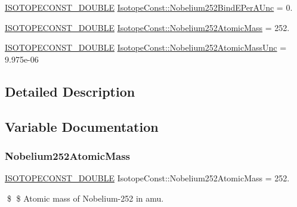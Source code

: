 \begin{DoxyCompactItemize}
\mbox{\hyperlink{group___isotope_const-_macros_ga8f45a7272ce02c0b4c65c44636ed719a}{I\+S\+O\+T\+O\+P\+E\+C\+O\+N\+S\+T\+\_\+\+D\+O\+U\+B\+LE}} \mbox{\hyperlink{group___isotope_const-_nobelium-_no252_ga08a5d790973b105d6891b772dd71ed05}{Isotope\+Const\+::\+Nobelium252\+Bind\+E\+Per\+A\+Unc}} = 0.
\item 
\mbox{\hyperlink{group___isotope_const-_macros_ga8f45a7272ce02c0b4c65c44636ed719a}{I\+S\+O\+T\+O\+P\+E\+C\+O\+N\+S\+T\+\_\+\+D\+O\+U\+B\+LE}} \mbox{\hyperlink{group___isotope_const-_nobelium-_no252_ga72af2ceb8d68d671a45b9e6c502e8c43}{Isotope\+Const\+::\+Nobelium252\+Atomic\+Mass}} = 252.
\item 
\mbox{\hyperlink{group___isotope_const-_macros_ga8f45a7272ce02c0b4c65c44636ed719a}{I\+S\+O\+T\+O\+P\+E\+C\+O\+N\+S\+T\+\_\+\+D\+O\+U\+B\+LE}} \mbox{\hyperlink{group___isotope_const-_nobelium-_no252_ga77e3aa3dc6de9f7aee933332f3df3913}{Isotope\+Const\+::\+Nobelium252\+Atomic\+Mass\+Unc}} = 9.\+975e-\/06
\end{DoxyCompactItemize}


\subsection{Detailed Description}


\subsection{Variable Documentation}
\mbox{\label{group___isotope_const-_nobelium-_no252_ga72af2ceb8d68d671a45b9e6c502e8c43}} 
\subsubsection{\texorpdfstring{Nobelium252\+Atomic\+Mass}{Nobelium252AtomicMass}}
{\footnotesize\ttfamily \mbox{\hyperlink{group___isotope_const-_macros_ga8f45a7272ce02c0b4c65c44636ed719a}{I\+S\+O\+T\+O\+P\+E\+C\+O\+N\+S\+T\+\_\+\+D\+O\+U\+B\+LE}} Isotope\+Const\+::\+Nobelium252\+Atomic\+Mass = 252.}

\$ \$ Atomic mass of Nobelium-\/252 in amu. \mbox{\label{group___isotope_const-_nobelium-_no252_ga77e3aa3dc6de9f7aee933332f3df3913}} 

